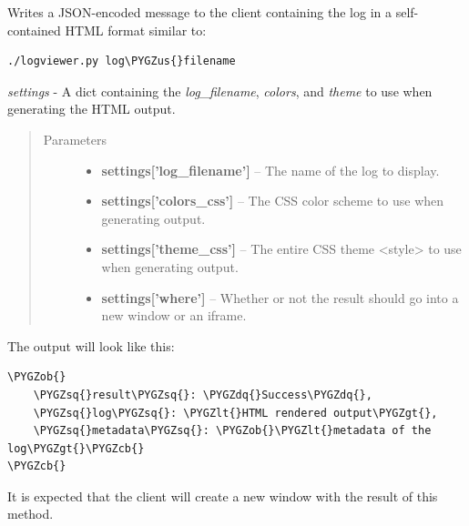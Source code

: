 \documentclass[letterpaper,10pt,openany]{sphinxmanual}
\def\PYGZus{\char`\_}
\def\PYGZob{\char`\{}
\def\PYGZcb{\char`\}}
\def\PYGZlt{\char`\<}
\def\PYGZgt{\char`\>}
\def\PYGZsq{\char`\'}
\def\PYGZdq{\char`\"}
\begin{document}
\begin{fulllineitems}
\label{Applications/terminal/plugin_logging:logging_plugin._retrieve_log_playback}
Writes a JSON-encoded message to the client containing the log in a
self-contained HTML format similar to:

\begin{Verbatim}[commandchars=\\\{\}]
./logviewer.py log\PYGZus{}filename
\end{Verbatim}

\emph{settings} - A dict containing the \emph{log\_filename}, \emph{colors}, and \emph{theme} to
use when generating the HTML output.
\begin{quote}\begin{description}
\item[{Parameters}] \leavevmode\begin{itemize}
\item {} 
\textbf{settings{[}'log\_filename'{]}} -- The name of the log to display.

\item {} 
\textbf{settings{[}'colors\_css'{]}} -- The CSS color scheme to use when generating output.

\item {} 
\textbf{settings{[}'theme\_css'{]}} -- The entire CSS theme \textless{}style\textgreater{} to use when generating output.

\item {} 
\textbf{settings{[}'where'{]}} -- Whether or not the result should go into a new window or an iframe.

\end{itemize}

\end{description}\end{quote}

The output will look like this:

\begin{Verbatim}[commandchars=\\\{\}]
\PYGZob{}
    \PYGZsq{}result\PYGZsq{}: \PYGZdq{}Success\PYGZdq{},
    \PYGZsq{}log\PYGZsq{}: \PYGZlt{}HTML rendered output\PYGZgt{},
    \PYGZsq{}metadata\PYGZsq{}: \PYGZob{}\PYGZlt{}metadata of the log\PYGZgt{}\PYGZcb{}
\PYGZcb{}
\end{Verbatim}

It is expected that the client will create a new window with the result of
this method.

\end{fulllineitems}
\end{document}
